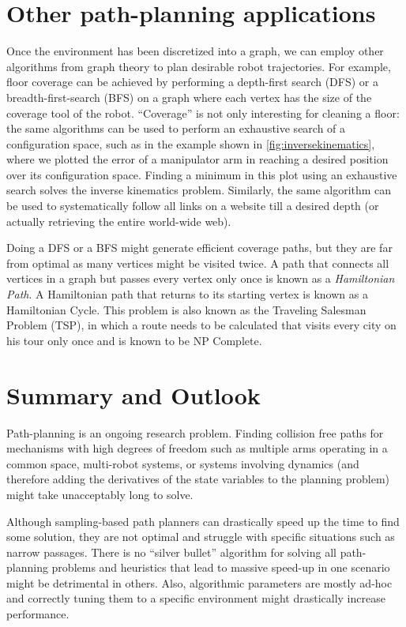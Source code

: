 \section{Other path-planning applications}

Once the environment has been discretized into a graph, we can employ other algorithms from graph theory to plan desirable robot trajectories. For example, floor coverage can be achieved by performing a depth-first search (DFS) or a breadth-first-search (BFS) on a graph where each vertex has the size of the coverage tool of the robot. ``Coverage'' is not only interesting for cleaning a floor: the same algorithms can be used to perform an exhaustive search of a configuration space, such as in the example shown in \cref{fig:inversekinematics}, where we plotted the error of a manipulator arm in reaching a desired position over its configuration space. Finding a minimum in this plot using an exhaustive search solves the inverse kinematics problem. Similarly, the same algorithm can be used to systematically follow all links on a website till a desired depth (or actually retrieving the entire world-wide web).

Doing a DFS or a BFS might generate efficient coverage paths, but they are far from optimal as many vertices might be visited twice. A path that connects all vertices in a graph but passes every vertex only once is known as a \textsl{Hamiltonian Path}. A Hamiltonian path that returns to its starting vertex is known as a Hamiltonian Cycle. This problem is also known as the Traveling Salesman Problem (TSP), in which a route needs to be calculated that visits every city on his tour only once and is known to be NP Complete.


\section{Summary and Outlook}
Path-planning is an ongoing research problem. Finding collision free paths for mechanisms with high degrees of freedom such as multiple arms operating in a common space, multi-robot systems, or systems involving dynamics (and therefore adding the derivatives of the state variables to the planning problem) might take unacceptably long to solve.

Although sampling-based path planners can drastically speed up the time to find some solution, they are not optimal and struggle with specific situations such as narrow passages. There is no ``silver bullet'' algorithm for solving all path-planning problems and heuristics that lead to massive speed-up in one scenario might be detrimental in others. Also, algorithmic parameters are mostly ad-hoc and correctly tuning them to a specific environment might drastically increase performance.


